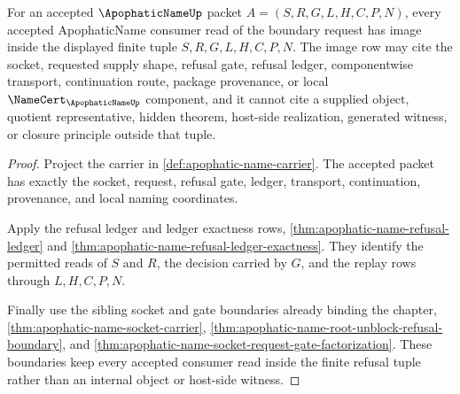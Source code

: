 \begin{theorem}
\label{thm:apophatic-name-boundary-request-image-row}
For an accepted $\ApophaticNameUp$ packet $A=(S,R,G,L,H,C,P,N)$, every accepted ApophaticName consumer read of the boundary request has image inside the displayed finite tuple $S,R,G,L,H,C,P,N$. The image row may cite the socket, requested supply shape, refusal gate, refusal ledger, componentwise transport, continuation route, package provenance, or local $\NameCert_{\ApophaticNameUp}$ component, and it cannot cite a supplied object, quotient representative, hidden theorem, host-side realization, generated witness, or closure principle outside that tuple.
\end{theorem}
\begin{proof}
Project the carrier in \autoref{def:apophatic-name-carrier}. The accepted packet has exactly the socket, request, refusal gate, ledger, transport, continuation, provenance, and local naming coordinates.

Apply the refusal ledger and ledger exactness rows, \autoref{thm:apophatic-name-refusal-ledger} and \autoref{thm:apophatic-name-refusal-ledger-exactness}. They identify the permitted reads of $S$ and $R$, the decision carried by $G$, and the replay rows through $L,H,C,P,N$.

Finally use the sibling socket and gate boundaries already binding the chapter, \autoref{thm:apophatic-name-socket-carrier}, \autoref{thm:apophatic-name-root-unblock-refusal-boundary}, and \autoref{thm:apophatic-name-socket-request-gate-factorization}. These boundaries keep every accepted consumer read inside the finite refusal tuple rather than an internal object or host-side witness.
\end{proof}

